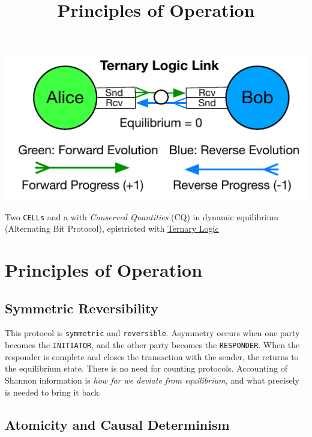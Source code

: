 \documentclass[../HFT-main.tex]{subfiles}
\title{Principles of Operation}
\begin{document}
\clearpage

\begin{marginfigure}	%
\centering
   \includegraphics[width=1.15\textwidth]{../figures/ternary-link.pdf}
\caption{\centering Two \texttt{CELLs} and a \LINK with \emph{Conserved Quantities} (CQ) in dynamic equilibrium (Alternating Bit Protocol), epistricted with \href{https://en.wikipedia.org/wiki/Three-valued_logic}{Ternary Logic}}%
\label{fig:LINK}
\end{marginfigure}

\section{\Huge Principles of Operation}

\subsection{Symmetric Reversibility}

This protocol is  \texttt{symmetric} and \texttt{reversible}.  Asymmetry occurs  when one party becomes the \texttt{INITIATOR}, and the other party becomes the \texttt{RESPONDER}. When the responder is complete and closes the transaction with the sender, the \LINK returns to the equilibrium state. There is no need for counting protocols. Accounting of Shannon information is \emph{how far we deviate from equilibrium}, and what precisely is needed to bring it back.

\subsection{Atomicity and Causal Determinism}

\end{document}
